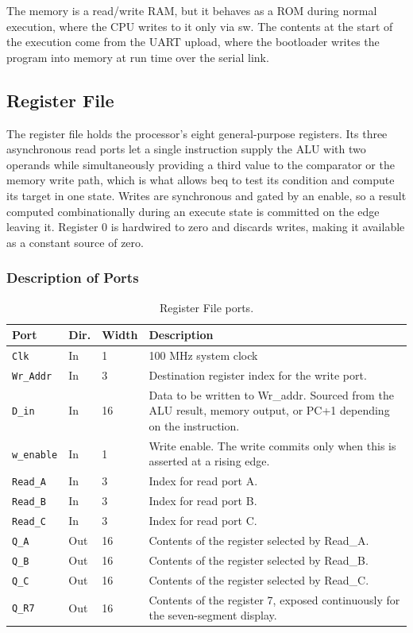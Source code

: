\documentclass[11pt,letterpaper]{article}
\begin{document}
The memory is a read/write RAM, but it behaves as a ROM during normal execution, where the CPU writes to it only via sw. The contents at the start of the execution come from the UART upload, where the bootloader writes the program into memory at run time over the serial link. 

\subsection{Register File}
The register file holds the processor's eight general-purpose registers. Its three asynchronous read ports let a single instruction supply the ALU with two operands while simultaneously providing a third value to the comparator or the memory write path, which is what allows beq to test its condition and compute its target in one state. Writes are synchronous and gated by an enable, so a result computed combinationally during an execute state is committed on the edge leaving it. Register 0 is hardwired to zero and discards writes, making it available as a constant source of zero.

\subsubsection{Description of Ports}
\begin{table}[H]
  \centering
  \small
  \begin{tabular}{@{}lllp{}@{}}
    \toprule
    \textbf{Port} & \textbf{Dir.} & \textbf{Width} & \textbf{Description} \\
    \midrule
    \texttt{Clk}             & In  & 1  & 100 MHz system clock\\
    \texttt{Wr\_Addr} & In & 3 & Destination register index for the write port.\\
    \texttt{D\_in} & In & 16 & Data to be written to Wr\_addr. Sourced from the ALU result, memory output, or PC+1 depending on the instruction.\\
    \texttt{w\_enable} & In & 1 & Write enable. The write commits only when this is asserted at a rising edge.\\
    \texttt{Read\_A} & In & 3 & Index for read port A.\\
    \texttt{Read\_B} & In & 3 & Index for read port B.\\
    \texttt{Read\_C} & In & 3 & Index for read port C.\\
    \texttt{Q\_A} & Out & 16 & Contents of the register selected by Read\_A.\\
    \texttt{Q\_B} & Out & 16 & Contents of the register selected by Read\_B.\\
    \texttt{Q\_C} & Out & 16 & Contents of the register selected by Read\_C.\\
    \texttt{Q\_R7} & Out & 16 & Contents of the register 7, exposed continuously for the seven-segment display.\\
    \bottomrule
  \end{tabular}
  \caption{Register File ports.}
\end{table}
\end{document}
